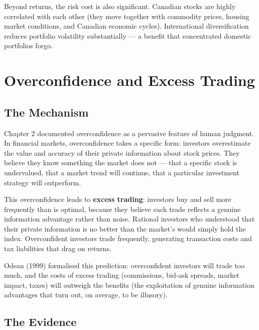 \documentclass[12pt, letterpaper]{article}
\begin{document}
Beyond returns, the risk cost is also significant. Canadian stocks are highly correlated with each other (they move together with commodity prices, housing market conditions, and Canadian economic cycles). International diversification reduces portfolio volatility substantially --- a benefit that concentrated domestic portfolios forgo.

\medskip


\section{Overconfidence and Excess Trading}



\subsection{The Mechanism}


Chapter 2 documented overconfidence as a pervasive feature of human judgment. In financial markets, overconfidence takes a specific form: investors overestimate the value and accuracy of their private information about stock prices. They believe they know something the market does not --- that a specific stock is undervalued, that a market trend will continue, that a particular investment strategy will outperform.

This overconfidence leads to \textbf{excess trading}: investors buy and sell more frequently than is optimal, because they believe each trade reflects a genuine information advantage rather than noise. Rational investors who understood that their private information is no better than the market's would simply hold the index. Overconfident investors trade frequently, generating transaction costs and tax liabilities that drag on returns.

Odean (1999) formalised this prediction: overconfident investors will trade too much, and the costs of excess trading (commissions, bid-ask spreads, market impact, taxes) will outweigh the benefits (the exploitation of genuine information advantages that turn out, on average, to be illusory).


\subsection{The Evidence}
\end{document}
